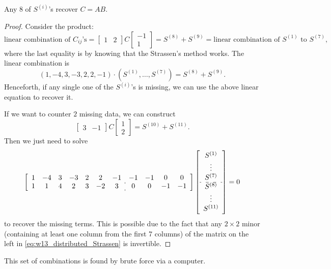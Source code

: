 \begin{theorem}
    Any $8$ of $S^{(i)}$'s recover $C=AB$.
\end{theorem}
\begin{proof}
    Consider the product:
    \begin{equation*}
        \text{linear combination of $C_{ij}$'s} = \left[\begin{matrix}
            1 & 2
        \end{matrix}\right] C \left[\begin{matrix}
            -1 \\ 1
        \end{matrix}\right] = S^{(8)} + S^{(9)} = \text{linear combination of $S^{(1)}$ to $S^{(7)}$},
    \end{equation*}
    where the last equality is by knowing that the Strassen's method works. The linear combination is
    \begin{equation}
        (1,-4,3,-3,2,2,-1)\cdot(S^{(1)},\ldots,S^{(7)}) = S^{(8)} + S^{(9)}.
    \end{equation}
    Henceforth, if any single one of the $S^{(i)}$'s is missing, we can use the above linear equation to recover it.

    If we want to counter $2$ missing data, we can construct
    \begin{equation*}
        \left[\begin{matrix}
            3 & -1
        \end{matrix}\right] C \left[\begin{matrix}
            1 \\ 2
        \end{matrix}\right] = S^{(10)} + S^{(11)}.
    \end{equation*}
    Then we just need to solve
    \begin{equation}
        \left[\begin{array}{ccccccc:cccc}
            1 & -4 & 3 & -3 & 2 & 2 & -1 & -1 & -1 & 0 & 0 \\
            1 & 1 & 4 & 2 & 3 & -2 & 3 & 0 & 0 & -1 & -1
        \end{array}\right] \left[\begin{array}{c}
            S^{(1)} \\ \vdots \\ S^{(7)} \\ \hdashline S^{(8)} \\ \vdots \\ S^{(11)}
        \end{array}\right] = 0 \label{eq:w13_distributed_Strassen}
    \end{equation}
    to recover the missing terms. This is possible due to the fact that any $2\times 2$ minor (containing at least one column from the first 7 columns) of the matrix on the left in \autoref{eq:w13_distributed_Strassen} is invertible.
\end{proof}
This set of combinations is found by brute force via a computer.




